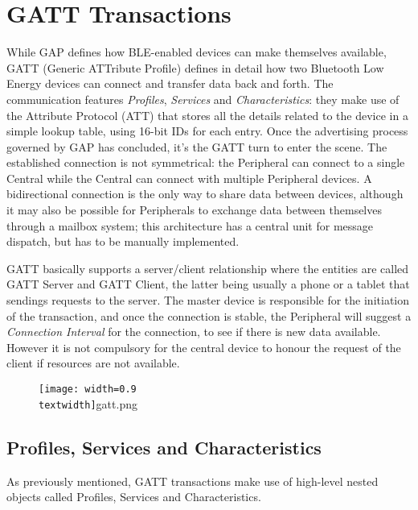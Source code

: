 \section{GATT Transactions}
While GAP defines how BLE-enabled devices can make themselves available, GATT (Generic ATTribute Profile) defines in detail how two Bluetooth Low Energy devices can connect and transfer data back and forth.
The communication features \textit{Profiles}, \textit{Services} and \textit{Characteristics}: they make use of the Attribute Protocol (ATT) that stores all the details related to the device in a simple lookup table, using 16-bit IDs for each entry.
Once the advertising process governed by GAP has concluded, it's the GATT turn to enter the scene. The established connection is not symmetrical: the Peripheral can connect to a single Central while the Central can connect with multiple Peripheral devices. A bidirectional connection is the only way to share data between devices, although it may also be possible for Peripherals to exchange data between themselves through a mailbox system; this architecture has a central unit for message dispatch, but has to be manually implemented.

GATT basically supports a server/client relationship where the entities are called GATT Server and GATT Client, the latter being usually a phone or a tablet that sendings requests to the server. The master device is responsible for the initiation of the transaction, and once the connection is stable, the Peripheral will suggest a \textit{Connection Interval} for the connection, to see if there is new data available. However it is not compulsory for the central device to honour the request of the client if resources are not available.

\begin{figure}
	\centering	
		\texttt{[image: width=0.9\\textwidth]}{gatt.png}
	\label{fig:gatt}
\end{figure}

\subsection{Profiles, Services and Characteristics}
As previously mentioned, GATT transactions make use of high-level nested objects called Profiles, Services and Characteristics.

